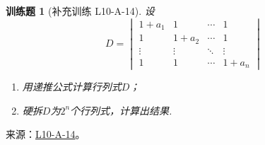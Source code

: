 \documentclass[UTF8,12pt,a4paper,fontset=fandol]{ctexart}
\newtheorem{exercise}{训练题}[section]
\begin{document}
\begin{exercise}[补充训练 L10-A-14]\label{prob:L10-A-14}
设
        \[ D=\begin{vmatrix}
                1+a_1  & 1      & \cdots & 1      \\
                1      & 1+a_2  & \cdots & 1      \\
                \vdots & \vdots & \ddots & \vdots \\
                1      & 1      & \cdots & 1+a_n
            \end{vmatrix} \]
        \begin{enumerate}
            \item 用递推公式计算行列式$D$；

            \item 硬拆$D$为$2^n$个行列式，计算出结果.
        \end{enumerate}
\end{exercise}
\noindent 来源：\href{https://github.com/yhwu-is/Linear-Algebra-Left-Undone/blob/new/%E8%AE%B2%E4%B9%89/%E4%B8%93%E9%A2%98/10%20%E8%A1%8C%E5%88%97%E5%BC%8F.tex}{L10-A-14}。
\end{document}

